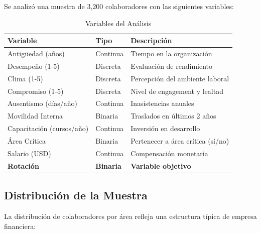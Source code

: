 \documentclass[11pt,a4paper,twoside]{article}
\begin{document}
Se analizó una muestra de 3,200 colaboradores con las siguientes variables:

\begin{table}[H]
    \centering
    \caption{Variables del Análisis}
    \begin{tabular}{|l|l|p{6cm}|}
        \toprule
        \textbf{Variable} & \textbf{Tipo} & \textbf{Descripción} \\
        \midrule
        Antigüedad (años) & Continua & Tiempo en la organización \\
        Desempeño (1-5) & Discreta & Evaluación de rendimiento \\
        Clima (1-5) & Discreta & Percepción del ambiente laboral \\
        Compromiso (1-5) & Discreta & Nivel de engagement y lealtad \\
        Ausentismo (días/año) & Continua & Inasistencias anuales \\
        Movilidad Interna & Binaria & Traslados en últimos 2 años \\
        Capacitación (cursos/año) & Continua & Inversión en desarrollo \\
        Área Crítica & Binaria & Pertenecer a área crítica (sí/no) \\
        Salario (USD) & Continua & Compensación monetaria \\
        \textbf{Rotación} & \textbf{Binaria} & \textbf{Variable objetivo} \\
        \bottomrule
    \end{tabular}
\end{table}

\subsection{Distribución de la Muestra}

La distribución de colaboradores por área refleja una estructura típica de empresa financiera:
\end{document}
